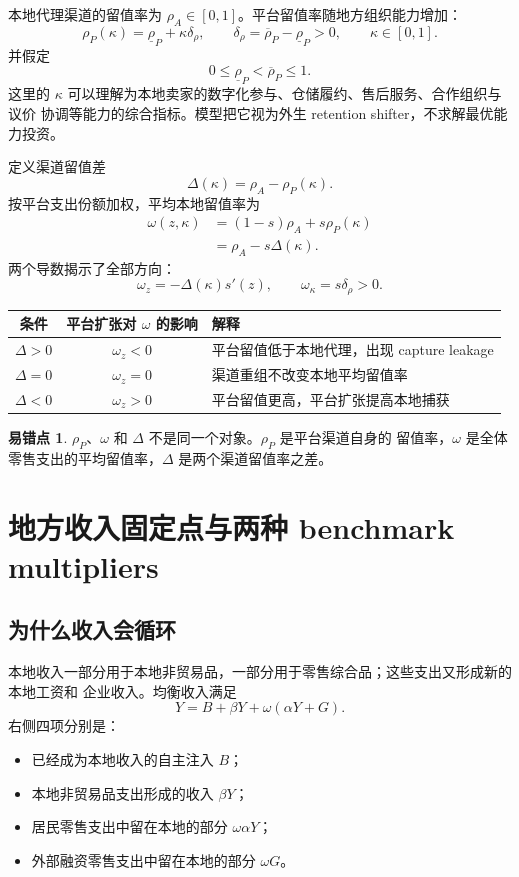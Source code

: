 \documentclass[UTF8,11pt,scheme=chinese,fontset=windows]{ctexart}
\theoremstyle{definition}
\newtheorem{commonerror}{易错点}[section]
\begin{document}
本地代理渠道的留值率为 \(\rho_A\in[0,1]\)。平台留值率随地方组织能力增加：
\[
\rho_P(\kappa)=\underline\rho_P+\kappa\delta_\rho,
\qquad
\delta_\rho=\overline\rho_P-\underline\rho_P>0,
\qquad \kappa\in[0,1].
\]
并假定
\[
0\leq\underline\rho_P<\overline\rho_P\leq1.
\]
这里的 \(\kappa\) 可以理解为本地卖家的数字化参与、仓储履约、售后服务、合作组织与议价
协调等能力的综合指标。模型把它视为外生 retention shifter，不求解最优能力投资。

定义渠道留值差
\[
\Delta(\kappa)=\rho_A-\rho_P(\kappa).
\]
按平台支出份额加权，平均本地留值率为
\begin{align*}
\omega(z,\kappa)
&=(1-s)\rho_A+s\rho_P(\kappa)\\
&=\rho_A-s\Delta(\kappa).
\end{align*}
两个导数揭示了全部方向：
\[
\omega_z=-\Delta(\kappa)s'(z),
\qquad
\omega_\kappa=s\delta_\rho>0.
\]

\begin{center}
\begin{tabular}{ccl}
\toprule
条件 & 平台扩张对 \(\omega\) 的影响 & 解释 \\
\midrule
\(\Delta>0\) & \(\omega_z<0\) & 平台留值低于本地代理，出现 capture leakage \\
\(\Delta=0\) & \(\omega_z=0\) & 渠道重组不改变本地平均留值率 \\
\(\Delta<0\) & \(\omega_z>0\) & 平台留值更高，平台扩张提高本地捕获 \\
\bottomrule
\end{tabular}
\end{center}

\begin{commonerror}
\(\rho_P\)、\(\omega\) 和 \(\Delta\) 不是同一个对象。\(\rho_P\) 是平台渠道自身的
留值率，\(\omega\) 是全体零售支出的平均留值率，\(\Delta\) 是两个渠道留值率之差。
\end{commonerror}

\section{地方收入固定点与两种 benchmark multipliers}

\subsection{为什么收入会循环}

本地收入一部分用于本地非贸易品，一部分用于零售综合品；这些支出又形成新的本地工资和
企业收入。均衡收入满足
\[
\boxed{Y=B+\beta Y+\omega(\alpha Y+G).}
\]
右侧四项分别是：
\begin{itemize}
  \item 已经成为本地收入的自主注入 \(B\)；
  \item 本地非贸易品支出形成的收入 \(\beta Y\)；
  \item 居民零售支出中留在本地的部分 \(\omega\alpha Y\)；
  \item 外部融资零售支出中留在本地的部分 \(\omega G\)。
\end{itemize}
\end{document}
